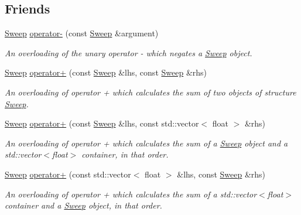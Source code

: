 \subsection*{Friends}
\begin{DoxyCompactItemize}
\item 
\mbox{\label{structSweep_a29420e86f220ed305794c8e560059bbc}} 
\hyperlink{structSweep}{Sweep} \hyperlink{structSweep_a29420e86f220ed305794c8e560059bbc}{operator-\/} (const \hyperlink{structSweep}{Sweep} \&argument)
\begin{DoxyCompactList}\small\item\em An overloading of the unary operator -\/ which negates a {\itshape \hyperlink{structSweep}{Sweep}} object. \end{DoxyCompactList}\item 
\mbox{\label{structSweep_a96391241f10ea728ee36b62f6c35d604}} 
\hyperlink{structSweep}{Sweep} \hyperlink{structSweep_a96391241f10ea728ee36b62f6c35d604}{operator+} (const \hyperlink{structSweep}{Sweep} \&lhs, const \hyperlink{structSweep}{Sweep} \&rhs)
\begin{DoxyCompactList}\small\item\em An overloading of operator + which calculates the sum of two objects of structure {\itshape \hyperlink{structSweep}{Sweep}}. \end{DoxyCompactList}\item 
\mbox{\label{structSweep_ab372b814f572937b3f0cef31752994b9}} 
\hyperlink{structSweep}{Sweep} \hyperlink{structSweep_ab372b814f572937b3f0cef31752994b9}{operator+} (const \hyperlink{structSweep}{Sweep} \&lhs, const std\+::vector$<$ float $>$ \&rhs)
\begin{DoxyCompactList}\small\item\em An overloading of operator + which calculates the sum of a {\itshape \hyperlink{structSweep}{Sweep}} object and a {\ttfamily std\+::vector$<$float$>$} container, in that order. \end{DoxyCompactList}\item 
\mbox{\label{structSweep_a770d2ac63866693c821c99cbfe2b2c9a}} 
\hyperlink{structSweep}{Sweep} \hyperlink{structSweep_a770d2ac63866693c821c99cbfe2b2c9a}{operator+} (const std\+::vector$<$ float $>$ \&lhs, const \hyperlink{structSweep}{Sweep} \&rhs)
\begin{DoxyCompactList}\small\item\em An overloading of operator + which calculates the sum of a {\ttfamily std\+::vector$<$float$>$} container and a {\itshape \hyperlink{structSweep}{Sweep}} object, in that order. \end{DoxyCompactList}\item 

\end{DoxyCompactItemize}
